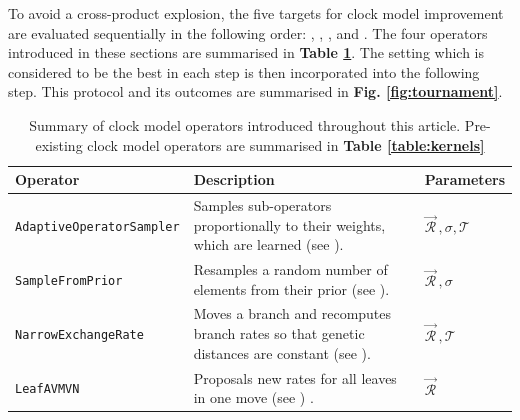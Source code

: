 \documentclass[10pt,letterpaper]{article}
\begin{document}


To avoid a cross-product explosion, the five targets for clock model improvement are evaluated sequentially in the following order: \textbf{} \textbf{}, \textbf{}, \textbf{}, and \textbf{}.
The four operators introduced in these sections are summarised in \textbf{Table \ref{table:newOperators}}.
The setting which is considered to be the best in each step is then incorporated into the following step. This protocol and its outcomes are summarised in \textbf{Fig. \ref{fig:tournament}}.



\begin{table}[h!]
\centering
\begin{tabular}{|l p{4cm} l|} 
 \hline
 Operator & Description & Parameters  \\
  \hline
 \texttt{AdaptiveOperatorSampler} & Samples sub-operators proportionally to their weights, which are learned (see \nameref{sect:adaptiveSampling}). & $\vec{\mathcal{R}}^{\,}, \sigma, \mathcal{T}$ \\
  \hline
 \texttt{SampleFromPrior} & Resamples a random number of elements from their prior (see \nameref{sect:adaptiveSampling}). & $\vec{\mathcal{R}}^{\,}, \sigma$ \\
  \hline
 \texttt{NarrowExchangeRate} & Moves a branch and recomputes branch rates so that genetic distances are constant (see \nameref{sect:NER}). & $\vec{\mathcal{R}}^{\,}, \mathcal{T}$\\
  \hline
 \texttt{LeafAVMVN}  & Proposals new rates for all leaves in one move (see \nameref{AVMVN_sect}) \cite{baele2017adaptive}. & $\vec{\mathcal{R}}^{\,}$ \\
  \hline
\end{tabular}
\caption{Summary of clock model operators introduced throughout this article. Pre-existing clock model operators are summarised in \textbf{Table \ref{table:kernels}}}
\label{table:newOperators}
\end{table}
\end{document}
